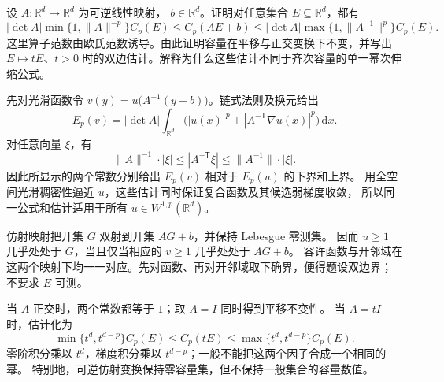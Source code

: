 \begin{exercise}\label{b1:ex:26-affine-capacity-comparison}
设 \(A\colon\mathbb R^d\rightarrow\mathbb R^d\) 为可逆线性映射，
\(b\in\mathbb R^d\)。证明对任意集合 \(E\subseteq\mathbb R^d\)，都有
\[
 |\det A|\min\{1,\|A\|^{-p}\}C_p(E)
 \le C_p(AE+b)
 \le|\det A|\max\{1,\|A^{-1}\|^p\}C_p(E).
\]
这里算子范数由欧氏范数诱导。由此证明容量在平移与正交变换下不变，并写出
\(E\mapsto tE\)、\(t>0\) 时的双边估计。解释为什么这些估计不同于齐次容量的单一幂次伸缩公式。
\end{exercise}
\begin{solution}
先对光滑函数令 \(v(y)=u\bigl(A^{-1}(y-b)\bigr)\)。链式法则及换元给出
\[
 E_p(v)=|\det A|\int_{\mathbb R^d}
       \bigl(|u(x)|^p+|A^{-\mathsf T}\nabla u(x)|^p\bigr)\,\mathrm dx.
\]
对任意向量 \(\xi\)，有
\[
 \|A\|^{-1}\cdot|\xi|\le |A^{-\mathsf T}\xi|
                         \le\|A^{-1}\|\cdot|\xi|.
\]
因此所显示的两个常数分别给出 \(E_p(v)\) 相对于 \(E_p(u)\) 的下界和上界。
用全空间光滑稠密性逼近 \(u\)，这些估计同时保证复合函数及其候选弱梯度收敛，
所以同一公式和估计适用于所有 \(u\in W^{1,p}(\mathbb R^d)\)。

仿射映射把开集 \(G\) 双射到开集 \(AG+b\)，并保持 Lebesgue 零测集。
因而 \(u\ge1\) 几乎处处于 \(G\)，当且仅当相应的 \(v\ge1\) 几乎处处于 \(AG+b\)。
容许函数与开邻域在这两个映射下均一一对应。先对函数、再对开邻域取下确界，便得题设双边界；
不要求 \(E\) 可测。

当 \(A\) 正交时，两个常数都等于 \(1\)；取 \(A=I\) 同时得到平移不变性。
当 \(A=tI\) 时，估计化为
\[
 \min\{t^d,t^{d-p}\}C_p(E)
 \le C_p(tE)
 \le\max\{t^d,t^{d-p}\}C_p(E).
\]
零阶积分乘以 \(t^d\)，梯度积分乘以 \(t^{d-p}\)；一般不能把这两个因子合成一个相同的幂。
特别地，可逆仿射变换保持零容量集，但不保持一般集合的容量数值。
\end{solution}

